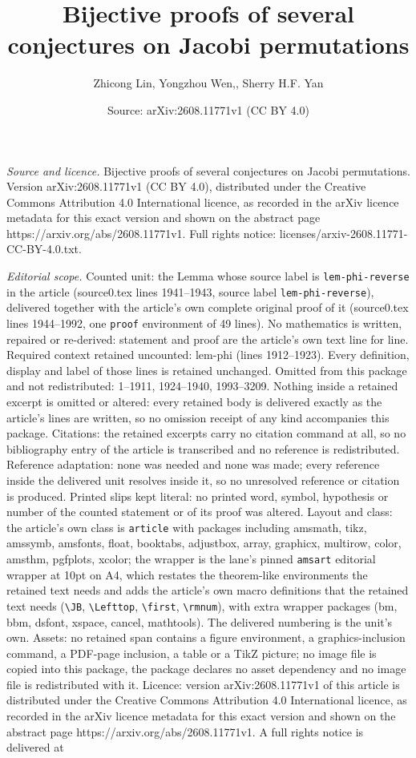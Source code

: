 \documentclass[10pt,a4paper]{amsart}
\title[Bijective proofs of several conjectures on Jacobi permutatio]{Bijective proofs of several conjectures on Jacobi permutations}
\author{Zhicong Lin, Yongzhou Wen,, Sherry H.F. Yan}
\date{Source: arXiv:2608.11771v1 (CC BY 4.0)}
\begin{document}
\maketitle

\noindent\emph{Source and licence.} Bijective proofs of several conjectures on Jacobi permutations. Version arXiv:2608.11771v1 (CC BY 4.0), distributed under the Creative Commons Attribution 4.0 International licence, as recorded in the arXiv licence metadata for this exact version and shown on the abstract page https://arxiv.org/abs/2608.11771v1. Full rights notice: licenses/arxiv-2608.11771-CC-BY-4.0.txt.\par\smallskip

\noindent\textit{Editorial scope.} Counted unit: the Lemma whose source label is \texttt{lem-phi-reverse} in the article (source0.tex lines 1941--1943, source label \texttt{lem-phi-reverse}), delivered together with the article's own complete original proof of it (source0.tex lines 1944--1992, one \texttt{proof} environment of 49 lines). No mathematics is written, repaired or re-derived: statement and proof are the article's own text line for line. Required context retained uncounted: lem-phi (lines 1912--1923). Every definition, display and label of those lines is retained unchanged. Omitted from this package and not redistributed: 1--1911, 1924--1940, 1993--3209. Nothing inside a retained excerpt is omitted or altered: every retained body is delivered exactly as the article's lines are written, so no omission receipt of any kind accompanies this package. Citations: the retained excerpts carry no citation command at all, so no bibliography entry of the article is transcribed and no reference is redistributed. Reference adaptation: none was needed and none was made; every reference inside the delivered unit resolves inside it, so no unresolved reference or citation is produced. Printed slips kept literal: no printed word, symbol, hypothesis or number of the counted statement or of its proof was altered. Layout and class: the article's own class is \texttt{article} with packages including amsmath, tikz, amssymb, amsfonts, float, booktabs, adjustbox, array, graphicx, multirow, color, amsthm, pgfplots, xcolor; the wrapper is the lane's pinned \texttt{amsart} editorial wrapper at 10pt on A4, which restates the theorem-like environments the retained text needs and adds the article's own macro definitions that the retained text needs (\texttt{\textbackslash JB}, \texttt{\textbackslash Lefttop}, \texttt{\textbackslash first}, \texttt{\textbackslash rmnum}), with extra wrapper packages (bm, bbm, dsfont, xspace, cancel, mathtools). The delivered numbering is the unit's own. Assets: no retained span contains a figure environment, a graphics-inclusion command, a PDF-page inclusion, a table or a TikZ picture; no image file is copied into this package, the package declares no asset dependency and no image file is redistributed with it. Licence: version arXiv:2608.11771v1 of this article is distributed under the Creative Commons Attribution 4.0 International licence, as recorded in the arXiv licence metadata for this exact version and shown on the abstract page https://arxiv.org/abs/2608.11771v1. A full rights notice is delivered at 
\end{document}
